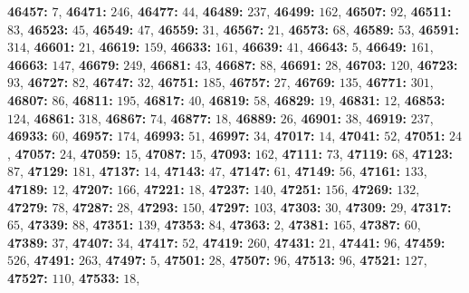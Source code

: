 \textsf{\bfseries 46457:} $7$, \textsf{\bfseries 46471:} $246$, \textsf{\bfseries 46477:} $44$, \textsf{\bfseries 46489:} $237$, \textsf{\bfseries 46499:} $162$, \textsf{\bfseries 46507:} $92$, \textsf{\bfseries 46511:} $83$, \textsf{\bfseries 46523:} $45$, \textsf{\bfseries 46549:} $47$, \textsf{\bfseries 46559:} $31$, \textsf{\bfseries 46567:} $21$, \textsf{\bfseries 46573:} $68$, \textsf{\bfseries 46589:} $53$, \textsf{\bfseries 46591:} $314$, \textsf{\bfseries 46601:} $21$, \textsf{\bfseries 46619:} $159$, \textsf{\bfseries 46633:} $161$, \textsf{\bfseries 46639:} $41$, \textsf{\bfseries 46643:} $5$, \textsf{\bfseries 46649:} $161$, \textsf{\bfseries 46663:} $147$, \textsf{\bfseries 46679:} $249$, \textsf{\bfseries 46681:} $43$, \textsf{\bfseries 46687:} $88$, \textsf{\bfseries 46691:} $28$, \textsf{\bfseries 46703:} $120$, \textsf{\bfseries 46723:} $93$, \textsf{\bfseries 46727:} $82$, \textsf{\bfseries 46747:} $32$, \textsf{\bfseries 46751:} $185$, \textsf{\bfseries 46757:} $27$, \textsf{\bfseries 46769:} $135$, \textsf{\bfseries 46771:} $301$, \textsf{\bfseries 46807:} $86$, \textsf{\bfseries 46811:} $195$, \textsf{\bfseries 46817:} $40$, \textsf{\bfseries 46819:} $58$, \textsf{\bfseries 46829:} $19$, \textsf{\bfseries 46831:} $12$, \textsf{\bfseries 46853:} $124$, \textsf{\bfseries 46861:} $318$, \textsf{\bfseries 46867:} $74$, \textsf{\bfseries 46877:} $18$, \textsf{\bfseries 46889:} $26$, \textsf{\bfseries 46901:} $38$, \textsf{\bfseries 46919:} $237$, \textsf{\bfseries 46933:} $60$, \textsf{\bfseries 46957:} $174$, \textsf{\bfseries 46993:} $51$, \textsf{\bfseries 46997:} $34$, \textsf{\bfseries 47017:} $14$, \textsf{\bfseries 47041:} $52$, \textsf{\bfseries 47051:} $24$, \textsf{\bfseries 47057:} $24$, \textsf{\bfseries 47059:} $15$, \textsf{\bfseries 47087:} $15$, \textsf{\bfseries 47093:} $162$, \textsf{\bfseries 47111:} $73$, \textsf{\bfseries 47119:} $68$, \textsf{\bfseries 47123:} $87$, \textsf{\bfseries 47129:} $181$, \textsf{\bfseries 47137:} $14$, \textsf{\bfseries 47143:} $47$, \textsf{\bfseries 47147:} $61$, \textsf{\bfseries 47149:} $56$, \textsf{\bfseries 47161:} $133$, \textsf{\bfseries 47189:} $12$, \textsf{\bfseries 47207:} $166$, \textsf{\bfseries 47221:} $18$, \textsf{\bfseries 47237:} $140$, \textsf{\bfseries 47251:} $156$, \textsf{\bfseries 47269:} $132$, \textsf{\bfseries 47279:} $78$, \textsf{\bfseries 47287:} $28$, \textsf{\bfseries 47293:} $150$, \textsf{\bfseries 47297:} $103$, \textsf{\bfseries 47303:} $30$, \textsf{\bfseries 47309:} $29$, \textsf{\bfseries 47317:} $65$, \textsf{\bfseries 47339:} $88$, \textsf{\bfseries 47351:} $139$, \textsf{\bfseries 47353:} $84$, \textsf{\bfseries 47363:} $2$, \textsf{\bfseries 47381:} $165$, \textsf{\bfseries 47387:} $60$, \textsf{\bfseries 47389:} $37$, \textsf{\bfseries 47407:} $34$, \textsf{\bfseries 47417:} $52$, \textsf{\bfseries 47419:} $260$, \textsf{\bfseries 47431:} $21$, \textsf{\bfseries 47441:} $96$, \textsf{\bfseries 47459:} $526$, \textsf{\bfseries 47491:} $263$, \textsf{\bfseries 47497:} $5$, \textsf{\bfseries 47501:} $28$, \textsf{\bfseries 47507:} $96$, \textsf{\bfseries 47513:} $96$, \textsf{\bfseries 47521:} $127$, \textsf{\bfseries 47527:} $110$, \textsf{\bfseries 47533:} $18$, 
